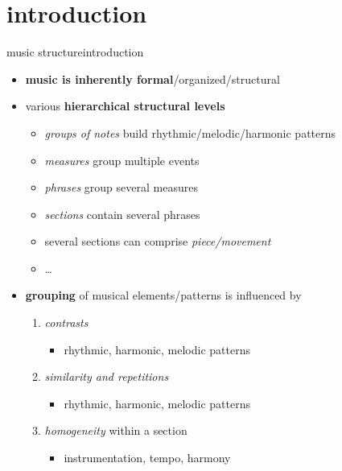     \section[intro]{introduction}
        \begin{frame}{music structure}{introduction}
            \begin{itemize}
                \item   \textbf{music is inherently formal}/organized/structural
                \smallskip
                \item<2->   various \textbf{hierarchical structural levels}
                    \begin{itemize}
                        \item   \textit{groups of notes} build rhythmic/melodic/harmonic patterns
                        \item   \textit{measures} group multiple events
                        \item   \textit{phrases} group several measures
                        \item   \textit{sections} contain several phrases
                        \item   several sections can comprise \textit{piece/movement}
                        \item   \ldots
                    \end{itemize}
                \smallskip
                \item<3->    \textbf{grouping} of musical elements/patterns is influenced by
                    \begin{enumerate}
                        \item   \textit{contrasts}
                            \begin{itemize}
                                \item   rhythmic, harmonic, melodic patterns
                            \end{itemize}
                        \item   \textit{similarity and repetitions}
                            \begin{itemize}
                                \item   rhythmic, harmonic, melodic patterns
                            \end{itemize}
                        \item   \textit{homogeneity} within a section 
                            \begin{itemize}
                                \item   instrumentation, tempo, harmony
                            \end{itemize}
                    \end{enumerate}
            \end{itemize}
        \end{frame}
